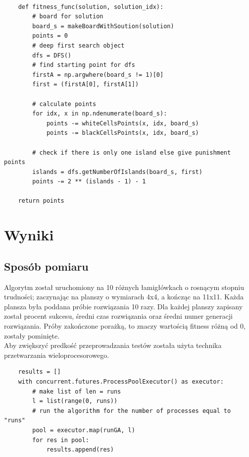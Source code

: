 \documentclass{article}
\begin{document}
\begin{verbatim}

    def fitness_func(solution, solution_idx):
        # board for solution
        board_s = makeBoardWithSoution(solution)
        points = 0
        # deep first search object
        dfs = DFS()
        # find starting point for dfs
        firstA = np.argwhere(board_s != 1)[0]
        first = (firstA[0], firstA[1])

        # calculate points
        for idx, x in np.ndenumerate(board_s):
            points -= whiteCellsPoints(x, idx, board_s)
            points -= blackCellsPoints(x, idx, board_s)

        # check if there is only one island else give punishment points
        islands = dfs.getNumberOfIslands(board_s, first)
        points -= 2 ** (islands - 1) - 1

    return points
\end{verbatim}

\section{Wyniki}

\subsection{Sposób pomiaru}
Algorytm został uruchomiony na 10 różnych łamigłówkach o rosnącym stopniu trudności; zaczynając na planszy o wymiarach 4x4, a kończąc na 11x11. Każda plansza była poddana próbie rozwiązania 10 razy. Dla każdej planszy zapisany został procent sukcesu, średni czas rozwiązania oraz średni numer generacji rozwiązania. Próby zakończone porażką, to znaczy wartością fitness różną od 0, zostały pominięte.\\
\newline
Aby zwiększyć predkość przeprowadzania testów została użyta technika przetwarzania wieloprocesorowego.

\begin{verbatim}
    results = []
    with concurrent.futures.ProcessPoolExecutor() as executor:
        # make list of len = runs
        l = list(range(0, runs))
        # run the algorithm for the number of processes equal to "runs"
        pool = executor.map(runGA, l)
        for res in pool:
            results.append(res)
\end{verbatim}
\end{document}
